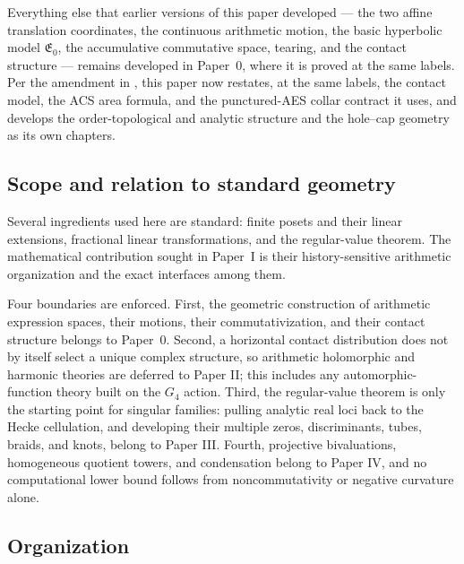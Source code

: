 Everything else that earlier versions of this paper developed --- the two affine
translation coordinates, the continuous arithmetic motion, the basic hyperbolic
model $\mathfrak E_0$, the accumulative commutative space, tearing, and the
contact structure --- remains developed in Paper~0, where it is proved at the same
labels.  Per the amendment in ,
this paper now restates, at the same labels, the contact model, the ACS area
formula, and the punctured-AES collar contract it uses, and develops the
order-topological and analytic structure and the hole--cap geometry as its own
chapters.

\subsection{Scope and relation to standard geometry}

Several ingredients used here are standard: finite posets and their linear
extensions, fractional linear transformations, and the regular-value theorem.
The mathematical contribution sought in Paper~I is their history-sensitive
arithmetic organization and the exact interfaces among them.

Four boundaries are enforced.  First, the geometric construction of arithmetic
expression spaces, their motions, their commutativization, and their contact
structure belongs to Paper~0.  Second, a horizontal contact distribution does not
by itself select a unique complex structure, so arithmetic holomorphic and
harmonic theories are deferred to Paper II; this includes any automorphic-function
theory built on the $G_4$ action.  Third, the regular-value theorem is only the
starting point for singular families: pulling analytic real loci back to the Hecke
cellulation, and developing their multiple zeros, discriminants, tubes, braids,
and knots, belong to Paper III.  Fourth, projective bivaluations, homogeneous
quotient towers, and condensation belong to Paper IV, and no computational lower
bound follows from noncommutativity or negative curvature alone.

\subsection{Organization}


